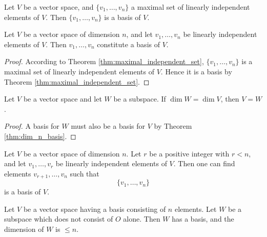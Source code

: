 \documentclass[../main.tex]{subfiles}
\begin{document}
    
    
    
    
    \begin{theorem} \label{thm:maximal_independent_set}
        Let \( V \) be a vector space, and \( \{ v_1, \dots, v_n \} \) a maximal set of linearly independent elements of \( V \). Then \( \{ v_1, \dots, v_n \} \) is a basis of \( V \).
        \end{theorem}
        
        \begin{theorem} \label{thm:dim_n_basis}
        Let \( V \) be a vector space of dimension \( n \), and let \( v_1, \dots, v_n \) be linearly independent elements of \( V \). Then \( v_1, \dots, v_n \) constitute a basis of \( V \).
        \end{theorem}
        
        \begin{proof}
        According to Theorem \ref{thm:maximal_independent_set}, \( \{ v_1, \dots, v_n \} \) is a maximal set of linearly independent elements of \( V \). Hence it is a basis by Theorem \ref{thm:maximal_independent_set}.
        \end{proof}
        
        \begin{corollary} \label{cor:equal_dimension}
        Let \( V \) be a vector space and let \( W \) be a subspace. If \( \dim W = \dim V \), then \( V = W \).
        \end{corollary}
        
        \begin{proof}
        A basis for \( W \) must also be a basis for \( V \) by Theorem \ref{thm:dim_n_basis}.
        \end{proof}
        
        \begin{corollary} \label{cor:extend_basis}
        Let \( V \) be a vector space of dimension \( n \). Let \( r \) be a positive integer with \( r < n \), and let \( v_1, \dots, v_r \) be linearly independent elements of \( V \). Then one can find elements \( v_{r+1}, \dots, v_n \) such that
        \[
        \{ v_1, \dots, v_n \}
        \]
        is a basis of \( V \).
        \end{corollary}
        
        \begin{theorem} \label{thm:subspace_basis}
        Let \( V \) be a vector space having a basis consisting of \( n \) elements. Let \( W \) be a subspace which does not consist of \( O \) alone. Then \( W \) has a basis, and the dimension of \( W \) is \( \leq n \).
        \end{theorem}
        
\end{document}
